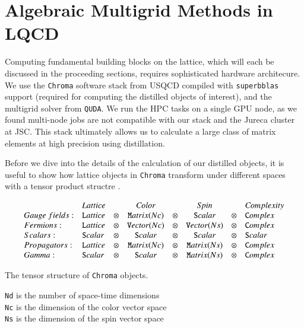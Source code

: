 \section{Algebraic Multigrid Methods in LQCD}
Computing fundamental building blocks on the lattice, which will each be discussed in the proceeding sections, requires sophisticated hardware architecure. We use the \verb|Chroma| software stack from USQCD \cite{Edwards_2005} compiled with \verb|superbblas| support (required for computing the distilled objects of interest), and the multigrid solver from \verb|QUDA|. We run the HPC tasks on a single GPU node, as we found multi-node jobs are not compatible with our stack and the Jureca cluster at JSC. This stack ultimately allows us to calculate a large class of matrix elements at high precision \cite{romero_efficient_2020} using distillation. 

Before we dive into the details of the calculation of our distilled objects, it is useful to show how lattice objects in \texttt{Chroma} transform under different spaces with a tensor product structre \cite{Edwards_2005}. 
\begin{table}
\begin{displaymath}
  \begin{array}{llcccccl}
                    & {\textit Lattice} &    &  {\textit Color} &     & {\textit Spin}  &     & {\textit Complexity}\\
  {Gauge\ fields:}& {\texttt Lattice} &\otimes& {\texttt Matrix(Nc)}&\otimes& {\texttt Scalar}    &\otimes& {\texttt Complex}\\
  {Fermions:}    & {\texttt Lattice} &\otimes& {\texttt Vector(Nc)}&\otimes& {\texttt Vector(Ns)}&\otimes& {\texttt Complex}\\
  {Scalars:}     & {\texttt Scalar}  &\otimes& {\texttt Scalar}    &\otimes& {\texttt Scalar}    &\otimes& {\texttt Scalar} \\
  {Propagators:} & {\texttt Lattice} &\otimes& {\texttt Matrix(Nc)}&\otimes& {\texttt Matrix(Ns)}&\otimes& {\texttt Complex}\\
  {Gamma:}       & {\texttt Scalar}  &\otimes& {\texttt Scalar}    &\otimes& {\texttt Matrix(Ns)}&\otimes& {\texttt Complex}\\
  \end{array}
  \end{displaymath}
  \caption{The tensor structure of \texttt{Chroma} objects.}
    \label{fig:chroma}
\end{table}

  
  \verb|Nd| is the number of space-time dimensions\\
  \verb|Nc| is the dimension of the color vector space\\
  \verb|Ns| is the dimension of the spin vector space\\
  
